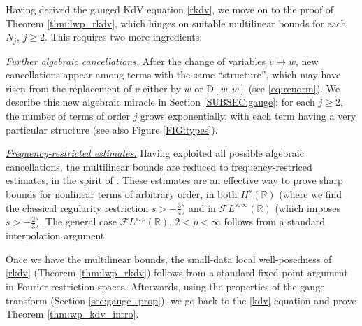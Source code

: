 \documentclass[a4paper,
11pt,  reqno]{amsart}
\newcommand{\5}{\textup{V}}
\newcommand{\noi}{\noindent}
\newcommand{\FL}{\mathcal{F} L}
\theoremstyle{remark}
\newcommand{\R}{\mathbb{R}}
\numberwithin{equation}{section}
\numberwithin{theorem}{section}
\newcommand{\D}{\mathrm{D}}
\begin{document}
	\medskip
	
	
	
	
	Having derived the gauged KdV equation \eqref{rkdv}, we move on to the proof of Theorem \ref{thm:lwp_rkdv}, which hinges on suitable multilinear bounds for each $N_j$, $j\ge 2$. This requires two more ingredients:

    \smallskip
    \noi\textit{\underline{Further algebraic cancellations.}} After the change of variables $v\mapsto w$, new cancellations appear among terms with the same ``structure'', which may have risen from the replacement of $v$ either by $w$ or $\D[w,w]$ (see \eqref{eq:renorm}). We describe this new algebraic miracle in Section \ref{SUBSEC:gauge}:  
for each $j\ge 2$, the number of terms of order $j$ grows exponentially, with each term having a very particular structure (see also Figure \ref{FIG:types}).

    
    \smallskip
    \noi\textit{\underline{Frequency-restricted estimates.}} Having exploited all possible algebraic cancellations, the multilinear bounds are reduced to frequency-restriced estimates, in the spirit of \cite{CC24, CLS, COS}. These estimates are an effective way to prove sharp bounds for nonlinear terms of arbitrary order, in both $H^s(\R)$ (where we find the classical regularity restriction $s>-\frac34$) and in $\FL^{s,\infty}(\R)$ (which imposes $s>-\frac23$). The general case $\FL^{s,p}(\R)$, $2<p<\infty$ follows from a standard interpolation argument.
	
	\medskip
	
	
	Once we have the multilinear bounds, the small-data local well-posedness of \eqref{rkdv} (Theorem \ref{thm:lwp_rkdv}) follows from a standard fixed-point argument in Fourier restriction spaces. Afterwards, using the properties of the gauge transform (Section \ref{sec:gauge_prop}), we go back to the \eqref{kdv} equation and prove Theorem \ref{thm:wp_kdv_intro}.
\end{document}

